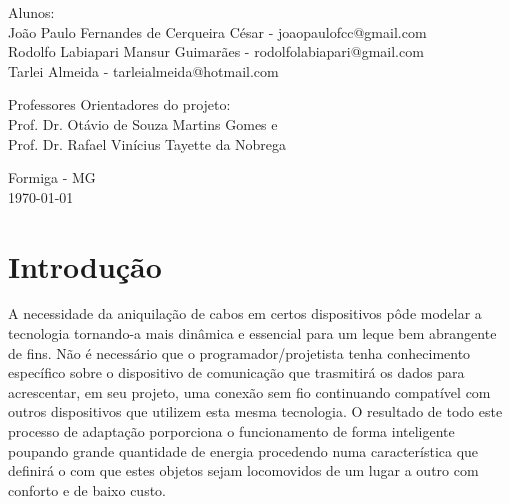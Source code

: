 \documentclass[portugues, brazil, a4paper,12pt]{article}
\begin{document}
\begin{titlepage}
  \vfill

  \begin{center}
    \begin{large}
      Alunos: \\
        João Paulo Fernandes de Cerqueira César - joaopaulofcc@gmail.com \\
		Rodolfo Labiapari Mansur Guimarães - rodolfolabiapari@gmail.com \\
		Tarlei Almeida - tarleialmeida@hotmail.com
    \end{large}
  \end{center}

\vfill

  \begin{center}
    \begin{large}
      Professores Orientadores do projeto:\\ Prof. Dr. Otávio de Souza Martins Gomes e \\ Prof. Dr. Rafael Vinícius Tayette da Nobrega
    \end{large}
  \end{center}

\vfill

  \begin{center}
    \begin{large}
      Formiga - MG \\
      \today \\
    \end{large}
  \end{center}

\clearpage
\tableofcontents 
\end{titlepage}


\newpage
\section{Introdução}

A necessidade da aniquilação de cabos em certos dispositivos pôde modelar a tecnologia tornando-a mais dinâmica e essencial para um leque bem abrangente de fins. Não é  necessário que o programador/projetista tenha conhecimento específico sobre o dispositivo de comunicação que trasmitirá os dados para acrescentar, em seu projeto, uma conexão sem fio continuando compatível com outros dispositivos que utilizem esta mesma tecnologia. O resultado de todo este processo de adaptação porporciona o funcionamento de forma inteligente poupando grande quantidade de energia procedendo numa característica que definirá o com que estes objetos sejam locomovidos de um lugar a outro com conforto e de baixo custo.
\end{document}
